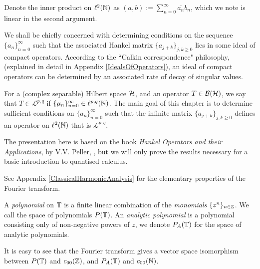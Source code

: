 Denote the inner product on $\ell^2(\mathbb{N})$ 
as $(a,b) := \sum_{n=0}^\infty \overline{a_n}b_n$, which we note
is linear in the second argument.

We shall be chiefly concerned with determining conditions on the sequence $\{a_n\}_{n=0}^\infty$
such that the associated Hankel matrix $\{a_{j+k}\}_{j,k\geq 0}$ lies in some ideal
of compact operators. According to the ``Calkin correspondence" philosophy, (explained
in detail in Appendix \ref{IdealsOfOperators}), an ideal of compact operators
can be determined by an associated rate of decay of singular values.

For a (complex separable) Hilbert space $\mathcal{H}$, and an operator $T \in \mathcal{B}(\mathcal{H})$, 
we say that $T \in \mathcal{L}^{p,q}$ if $\{\mu_n\}_{n=0}^\infty \in \ell^{p,q}(\mathbb{N})$.
The main goal of this chapter is to determine sufficient conditions on $\{a_n\}_{n=0}^\infty$
such that the infinite matrix $\{a_{j+k}\}_{j,k\geq 0}$ defines an operator
on $\ell^2(\mathbb{N})$ that is $\mathcal{L}^{p,q}$.

The presentation here is based on the book \emph{Hankel Operators
and their Applications}, by V.V. Peller, \cite{peller}, but we will only prove the results
necessary for a basic introduction to quantised calculus.


See Appendix \ref{ClassicalHarmonicAnalysis} for the elementary properties of the Fourier transform. 

A \emph{polynomial} on $\mathbb{T}$ is a finite linear combination of the \emph{monomials}
$\{z^n\}_{n \in \mathbb{Z}}$. We call the space of polynomials $P(\mathbb{T})$.
An \emph{analytic polynomial} is a polynomial consisting only of non-negative powers
of $z$, we denote $P_A(\mathbb{T})$ for the space of analytic polynomials. 

It is easy to see that the Fourier transform gives a vector space isomorphism between $P(\mathbb{T})$
and $c_{00}(\mathbb{Z})$, and $P_A(\mathbb{T})$ and $c_{00}(\mathbb{N})$.

